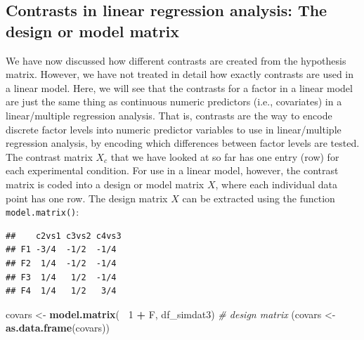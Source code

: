 \documentclass[12pt,]{krantz}
\newenvironment{Shaded}{\begin{snugshade}}{\end{snugshade}}
\newcommand{\KeywordTok}[1]{\textcolor[rgb]{0.13,0.29,0.53}{\textbf{#1}}}
\newcommand{\DecValTok}[1]{\textcolor[rgb]{0.00,0.00,0.81}{#1}}
\newcommand{\StringTok}[1]{\textcolor[rgb]{0.31,0.60,0.02}{#1}}
\newcommand{\CommentTok}[1]{\textcolor[rgb]{0.56,0.35,0.01}{\textit{#1}}}
\newcommand{\OperatorTok}[1]{\textcolor[rgb]{0.81,0.36,0.00}{\textbf{#1}}}
\newcommand{\NormalTok}[1]{#1}
\theoremstyle{definition}
\theoremstyle{definition}
\theoremstyle{definition}
\theoremstyle{remark}
\begin{document}
\subsection{Contrasts in linear regression analysis: The design or model
matrix}\label{contrasts-in-linear-regression-analysis-the-design-or-model-matrix}

We have now discussed how different contrasts are created from the
hypothesis matrix. However, we have not treated in detail how exactly
contrasts are used in a linear model. Here, we will see that the
contrasts for a factor in a linear model are just the same thing as
continuous numeric predictors (i.e., covariates) in a linear/multiple
regression analysis. That is, contrasts are the way to encode discrete
factor levels into numeric predictor variables to use in linear/multiple
regression analysis, by encoding which differences between factor levels
are tested. The contrast matrix \(X_c\) that we have looked at so far
has one entry (row) for each experimental condition. For use in a linear
model, however, the contrast matrix is coded into a design or model
matrix \(X\), where each individual data point has one row. The design
matrix \(X\) can be extracted using the function
\texttt{model.matrix()}:

\begin{Shaded}
\end{Shaded}

\begin{verbatim}
##    c2vs1 c3vs2 c4vs3
## F1 -3/4  -1/2  -1/4 
## F2  1/4  -1/2  -1/4 
## F3  1/4   1/2  -1/4 
## F4  1/4   1/2   3/4
\end{verbatim}

\begin{Shaded}
\begin{Highlighting}[]
\NormalTok{covars <-}\StringTok{ }\KeywordTok{model.matrix}\NormalTok{(}\OperatorTok{~}\StringTok{ }\DecValTok{1} \OperatorTok{+}\StringTok{ }\NormalTok{F, df_simdat3) }\CommentTok{# design matrix}
\NormalTok{(covars <-}\StringTok{ }\KeywordTok{as.data.frame}\NormalTok{(covars))}
\end{Highlighting}
\end{Shaded}
\end{document}
